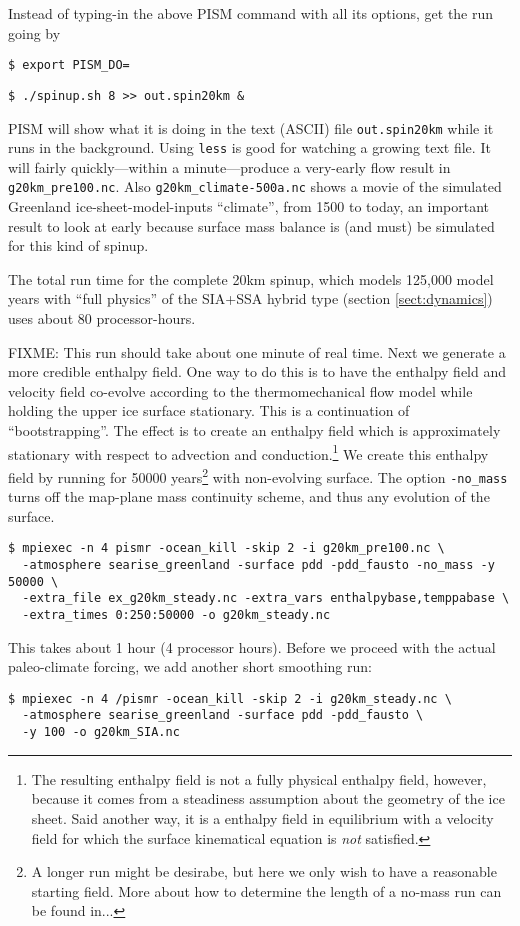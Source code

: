 Instead of typing-in the above PISM command with all its options, get the run going by

\verb|$ export PISM_DO=|

\verb|$ ./spinup.sh 8 >> out.spin20km &|

\noindent PISM will show what it is doing in the text (ASCII) file \verb|out.spin20km| while it runs in the background.  Using \verb|less| is good for watching a growing text file.  It will fairly quickly---within a minute---produce a very-early flow result in \verb|g20km_pre100.nc|.  Also \verb|g20km_climate-500a.nc| shows a movie of the simulated Greenland ice-sheet-model-inputs ``climate'', from 1500 to today, an important result to look at early because surface mass balance is (and must) be simulated for this kind of spinup.

The total run time for the complete 20km spinup, which models 125,000 model years with ``full physics'' of the SIA+SSA hybrid type (section \ref{sect:dynamics}) uses about 80 processor-hours.  

FIXME:  This run should take about one minute of real time. Next we generate a more credible enthalpy field. One way to do this is to have the enthalpy field and velocity field co-evolve according to the thermomechanical flow model while holding the upper ice surface stationary.  This is a continuation of ``bootstrapping''.  The effect is to create an enthalpy field which is approximately stationary with respect to advection and conduction.\footnote{The resulting enthalpy field is not a fully physical enthalpy field, however, because it comes from a steadiness assumption about the geometry of the ice sheet.  Said another way, it is a enthalpy field in equilibrium with a velocity field for which the surface kinematical equation \cite{Fowler} is \emph{not} satisfied.}  We create this enthalpy field by running for 50000 years\footnote{A longer run might be desirabe, but here we only wish to have a reasonable starting field. More about how to determine the length of a no-mass run can be found in...} with non-evolving surface.  The option \verb|-no_mass| turns off the map-plane mass continuity scheme, and thus any evolution of the surface.
\begin{verbatim}
$ mpiexec -n 4 pismr -ocean_kill -skip 2 -i g20km_pre100.nc \
  -atmosphere searise_greenland -surface pdd -pdd_fausto -no_mass -y 50000 \ 
  -extra_file ex_g20km_steady.nc -extra_vars enthalpybase,temppabase \ 
  -extra_times 0:250:50000 -o g20km_steady.nc
\end{verbatim} This takes about 1 hour (4 processor hours). Before we proceed with the actual paleo-climate forcing, we add another short smoothing run:
\begin{verbatim}
$ mpiexec -n 4 /pismr -ocean_kill -skip 2 -i g20km_steady.nc \
  -atmosphere searise_greenland -surface pdd -pdd_fausto \
  -y 100 -o g20km_SIA.nc
\end{verbatim}



